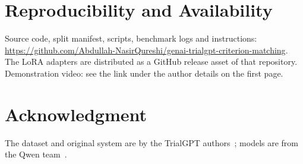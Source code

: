\documentclass[conference]{IEEEtran}
\begin{document}
\section*{Reproducibility and Availability}
Source code, split manifest, scripts, benchmark logs and instructions: \url{https://github.com/Abdullah-NasirQureshi/genai-trialgpt-criterion-matching}. The LoRA adapters are distributed as a GitHub release asset of that repository. Demonstration video: see the link under the author details on the first page.

\section*{Acknowledgment}
The dataset and original system are by the TrialGPT authors~\cite{jin2024trialgpt}; models are from the Qwen team~\cite{qwen2024qwen25}.





\end{document}
